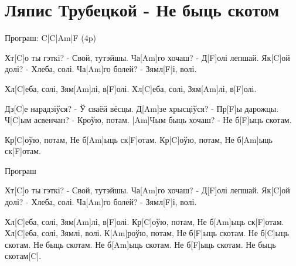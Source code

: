 \section{Ляпис Трубецкой - Не быць скотом}
\begin{guitar}

Програш: C|C|Am|F (4p)

Хт[C]о ты гэткі?
- Свой, тутэйшы.
Ча[Am]го хочаш?
- Д[F]олі лепшай.
Як[C]ой долі?
- Хлеба, солі.
Ча[Am]го болей?
- Зямл[F]і, волі.

Хл[C]еба, солі,
Зям[Am]лі, в[F]олі.
Хл[C]еба, солі,
Зям[Am]лі, в[F]олі.

Дз[C]е нарадзіўся?
- Ў сваёй вёсцы.
Д[Am]зе хрысціўся?
- Пр[F]ы дарожцы.
Ч[C]ым асвенчан?
- Кроўю, потам.
[Am]Чым быць хочаш?
- Не б[F]ыць скотам.

Кр[C]оўю, потам,
Не б[Am]ыць ск[F]отам.
Кр[C]оўю, потам,
Не б[Am]ыць ск[F]отам.

Програш

Хт[C]о ты гэткі?
- Свой, тутэйшы.
Ча[Am]го хочаш?
- Д[F]олі лепшай.
Як[C]ой долі?
- Хлеба, солі.
Ча[Am]го болей?
- Зямл[F]і, волі.

Хл[C]еба, солі,
Зям[Am]лі, в[F]олі.
Кр[C]оўю, потам,
Не б[Am]ыць ск[F]отам.
Хл[C]еба, солі,
Зямлі, волі.
К[Am]роўю, потам,
Не б[F]ыць скотам.
Не б[C]ыць скотам.
Не быць скотам.
Не б[Am]ыць скотам.
Не б[F]ыць скотам.
Не быць скотам[C].
\end{guitar}